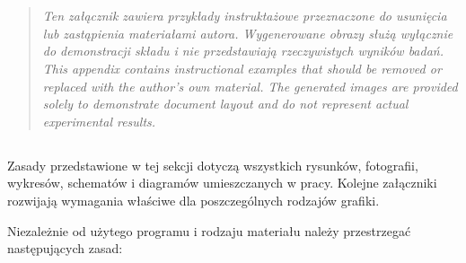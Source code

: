 {}

\chapter{}
\label{app:rysunki}

\begin{quote}
\itshape
\ploren
  {Ten załącznik zawiera przykłady instruktażowe przeznaczone do usunięcia lub zastąpienia materiałami autora. Wygenerowane obrazy służą wyłącznie do demonstracji składu i nie przedstawiają rzeczywistych wyników badań.}
  {This appendix contains instructional examples that should be removed or replaced with the author's own material. The generated images are provided solely to demonstrate document layout and do not represent actual experimental results.}
\end{quote}

\section{}

Zasady przedstawione w tej sekcji dotyczą wszystkich rysunków, fotografii, wykresów, schematów i diagramów umieszczanych w pracy. Kolejne załączniki rozwijają wymagania właściwe dla poszczególnych rodzajów grafiki.

Niezależnie od użytego programu i rodzaju materiału należy przestrzegać następujących zasad:

